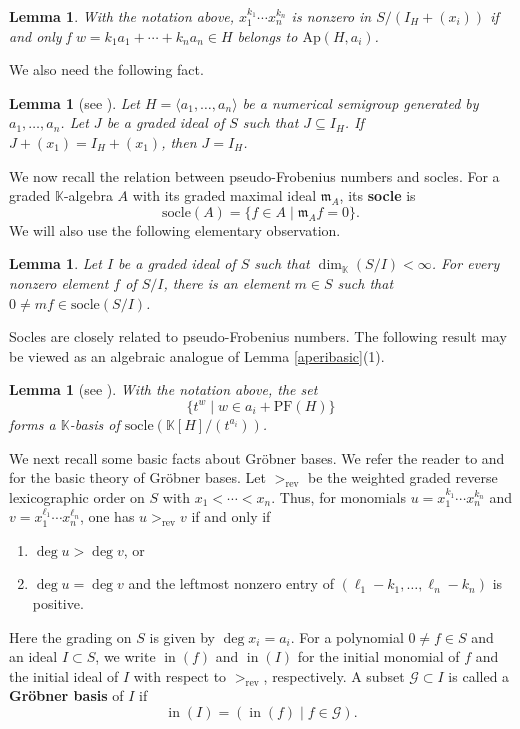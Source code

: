 \documentclass[12pt]{amsart}
\numberwithin{equation}{section}
\newtheorem{lemma}[theorem]{Lemma}
\theoremstyle{definition}
\newcommand{\init}{\ensuremath{\mathop{\mathrm{in}}}}
\newcommand{\mideal}{\ensuremath{\mathfrak{m}}}
\newcommand{\PF}{\mathrm{PF}}
\newcommand{\socle}{\mathrm{socle}}
\newcommand{\F}{\mathbb{K}}
\newcommand{\Ap}{\mathrm{Ap}}
\begin{document}
\begin{lemma}
\label{aperibasic2}
With the notation above,
$x_1^{k_1}\cdots x_n^{k_n}$ is nonzero in $S/(I_H+(x_i))$
if and only f
$w=k_1a_1+\cdots+k_na_n\in H$ belongs to $\Ap(H,a_i)$.
\end{lemma}

We also need the following fact.

\begin{lemma}[see {\cite[Proposition 2.10]{KMO}}]
\label{lem6}
Let $H=\langle a_1,\dots,a_n\rangle$ be a numerical semigroup
generated by $a_1,\dots,a_n$.
Let $J$ be a graded ideal of $S$ such that $J\subseteq I_H$.
If $J+(x_1)=I_H+(x_1)$, then $J=I_H$.
\end{lemma}

We now recall the relation between pseudo-Frobenius numbers and socles.
For a graded $\F$-algebra $A$ with its graded maximal ideal $\mideal_A$,
its {\bf socle} is 
\[
\socle(A)=\{f\in A\mid \mideal_A f=0\}.
\]
We will also use the following elementary observation.

\begin{lemma}
\label{lem5}
Let $I$ be a graded ideal of $S$ such that
$\dim_\F(S/I)<\infty$.
For every nonzero element $f$ of $S/I$, there is an element
$m\in S$ such that
$0\neq mf\in\socle(S/I)$.
\end{lemma}

Socles are closely related to pseudo-Frobenius numbers.
The following result may be viewed as an algebraic analogue of
Lemma \ref{aperibasic}(1).

\begin{lemma}[see {\cite[\S 5.1.1]{HMR}}]
\label{lem7}
With the notation above, the set
\[
\{t^w\mid w\in a_i+\PF(H)\}
\]
forms a $\F$-basis of
$\socle(\F[H]/(t^{a_i}))$.
\end{lemma}

We next recall some basic facts about Gr\"obner bases.
We refer the reader to \cite[\S 15]{Ei} and \cite[Chapter 2]{HH} for the basic theory of
Gr\"obner bases.
Let $>_{\mathrm{rev}}$ be the weighted graded reverse lexicographic
order on $S$ with $x_1<\cdots<x_n$.
Thus, for monomials
$u=x_1^{k_1}\cdots x_n^{k_n}$ and
$v=x_1^{\ell_1}\cdots x_n^{\ell_n}$, one has
$u>_{\mathrm{rev}}v$ if and only if
\begin{enumerate}
    \item[(i)] $\deg u>\deg v$, or
    \item[(ii)] $\deg u=\deg v$ and the leftmost nonzero entry of
    $(\ell_1-k_1,\dots,\ell_n-k_n)$ is positive.
\end{enumerate}
Here the grading on $S$ is given by $\deg x_i=a_i$.
For a polynomial $0 \ne f\in S$ and an ideal $I\subset S$, we write
$\init(f)$ and $\init(I)$ for the initial monomial of $f$ and the
initial ideal of $I$ with respect to $>_{\mathrm{rev}}$, respectively.
A subset $\mathcal G\subset I$ is called a {\bf Gr\"obner basis} of
$I$ if
\[
\init(I)=(\init(f)\mid f\in\mathcal G).
\]
\end{document}
